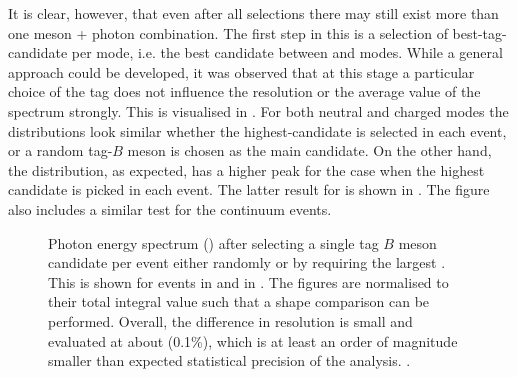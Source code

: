 It is clear, however, that even after all selections there may still exist more than one \B meson + photon combination.
The first step in this is a selection of best-tag-candidate per \FEI mode, i.e. the best candidate between \feiBp and \feiBz modes.
While a general approach could be developed, it was observed that at this stage a particular choice of the tag does not influence the resolution or the average value of the spectrum strongly.
This is visualised in .
For both neutral and charged \BtoXsgamma modes the distributions look similar whether the highest-\feiProb candidate is selected in each event, or a random tag-$B$ meson is chosen as the main candidate.
On the other hand, the \Mbc distribution, as expected, has a higher peak for the case when the highest \feiProb candidate is picked in each event.
The latter result for \BtoXsgamma is shown in .
The figure also includes a similar \Mbc test for the continuum events.

\begin{figure}[htbp!]
    \centering
    \caption{\label{fig:same_mode_best_tag_selection}Photon energy spectrum () after selecting a single tag $B$ meson candidate per event either randomly or by requiring the largest \feiProb.
    This is shown for \BptoXsgamma events in  
    and \BztoXsgamma in .
    The figures are normalised to their total integral value such that a shape comparison can be performed.
    Overall, the difference in resolution is small and evaluated at about \order(0.1\%), which is at least an order of magnitude smaller than expected statistical precision of the analysis.
    .
    }
\end{figure}

